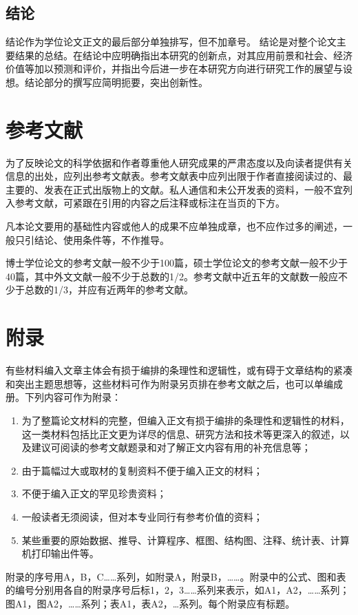 \subsection{结论}
结论作为学位论文正文的最后部分单独排写，但不加章号。
结论是对整个论文主要结果的总结。在结论中应明确指出本研究的创新点，对其应用前景和社会、经济价值等加以预测和评价，并指出今后进一步在本研究方向进行研究工作的展望与设想。结论部分的撰写应简明扼要，突出创新性。


\section{参考文献}
为了反映论文的科学依据和作者尊重他人研究成果的严肃态度以及向读者提供有关信息的出处，应列出参考文献表。参考文献表中应列出限于作者直接阅读过的、最主要的、发表在正式出版物上的文献。私人通信和未公开发表的资料，一般不宜列入参考文献，可紧跟在引用的内容之后注释或标注在当页的下方。

凡本论文要用的基础性内容或他人的成果不应单独成章，也不应作过多的阐述，一般只引结论、使用条件等，不作推导。

博士学位论文的参考文献一般不少于100篇，硕士学位论文的参考文献一般不少于40篇，其中外文文献一般不少于总数的1/2。参考文献中近五年的文献数一般应不少于总数的1/3，并应有近两年的参考文献。


\section{附录}
有些材料编入文章主体会有损于编排的条理性和逻辑性，或有碍于文章结构的紧凑和突出主题思想等，这些材料可作为附录另页排在参考文献之后，也可以单编成册。下列内容可作为附录：

\begin{enumerate}
\item 为了整篇论文材料的完整，但编入正文有损于编排的条理性和逻辑性的材料，这一类材料包括比正文更为详尽的信息、研究方法和技术等更深入的叙述，以及建议可阅读的参考文献题录和对了解正文内容有用的补充信息等；
\item 由于篇幅过大或取材的复制资料不便于编入正文的材料；
\item 不便于编入正文的罕见珍贵资料；
\item 一般读者无须阅读，但对本专业同行有参考价值的资料；
\item 某些重要的原始数据、推导、计算程序、框图、结构图、注释、统计表、计算机打印输出件等。
\end{enumerate}

附录的序号用A，B，C……系列，如附录A，附录B，……。附录中的公式、图和表的编号分别用各自的附录序号后标1，2，3……系列来表示，如A1，A2，……系列；图A1，图A2，……系列；表A1，表A2，…系列。每个附录应有标题。

